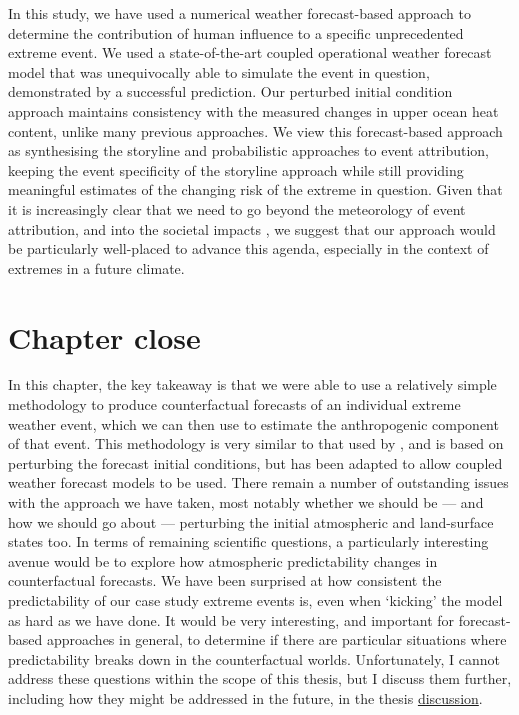     In this study, we have used a numerical weather forecast-based approach to determine the contribution of human influence to a specific unprecedented extreme event. We used a state-of-the-art coupled operational weather forecast model that was unequivocally able to simulate the event in question, demonstrated by a successful prediction. Our perturbed initial condition approach maintains consistency with the measured changes in upper ocean heat content, unlike many previous approaches. We view this forecast-based approach as synthesising the storyline and probabilistic approaches to event attribution, keeping the event specificity of the storyline approach while still providing meaningful estimates of the changing risk of the extreme in question. Given that it is increasingly clear that we need to go beyond the meteorology of event attribution, and into the societal impacts \cite{mitchell_climate_2021,mitchell_increased_2022}, we suggest that our approach would be particularly well-placed to advance this agenda, especially in the context of extremes in a future climate.

\section{Chapter close}\label{ch4:close}

  In this chapter, the key takeaway is that we were able to use a relatively simple methodology to produce counterfactual forecasts of an individual extreme weather event, which we can then use to estimate the anthropogenic component of that event. This methodology is very similar to that used by \citet{pall_anthropogenic_2011}, and is based on perturbing the forecast initial conditions, but has been adapted to allow coupled weather forecast models to be used. There remain a number of outstanding issues with the approach we have taken, most notably whether we should be --- and how we should go about --- perturbing the initial atmospheric and land-surface states too. In terms of remaining scientific questions, a particularly interesting avenue would be to explore how atmospheric predictability changes in counterfactual forecasts. We have been surprised at how consistent the predictability of our case study extreme events is, even when `kicking' the model as hard as we have done. It would be very interesting, and important for forecast-based approaches in general, to determine if there are particular situations where predictability breaks down in the counterfactual worlds. Unfortunately, I cannot address these questions within the scope of this thesis, but I discuss them further, including how they might be addressed in the future, in the thesis \hyperref[discussion]{discussion}.

